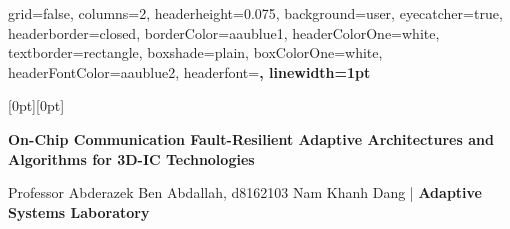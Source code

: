 \documentclass[a1paper,portrait]{baposter}
\let\oldtextbf\textbf
\renewcommand{\textbf}[1]{\textcolor{aaublue1}{\oldtextbf{#1}}}
\begin{document}
\begin{poster}{
  grid=false,
  columns=2,
  headerheight=0.075\textheight,
  background=user,
  eyecatcher=true,
  headerborder=closed,
  borderColor=aaublue1,
  headerColorOne=white,
  textborder=rectangle,
  boxshade=plain,
  boxColorOne=white,
  headerFontColor=aaublue2,
  headerfont=\large\sf\bf,
  linewidth=1pt
}
{
  \raisebox{-0.25\headerheight}[0pt][0pt]{%
      }
  
}
{\color{aaublue2}\huge\bf
On-Chip Communication Fault-Resilient Adaptive  Architectures and Algorithms  for 3D-IC Technologies        
}
{\color{aaublue2} \small
  Professor Abderazek Ben Abdallah, d8162103 Nam Khanh Dang | \textbf{ Adaptive Systems Laboratory}
  
}
\end{poster}
\end{document}
